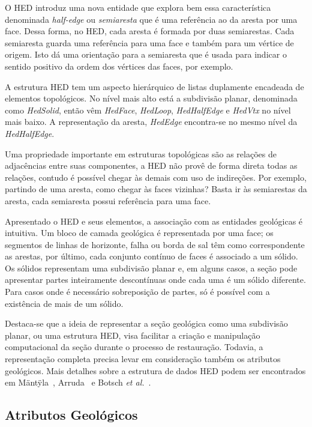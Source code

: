 O HED introduz uma nova entidade que explora bem essa característica denominada \textit{half-edge} ou \textit{semiaresta} que é uma referência ao  da aresta por uma face. Dessa forma, no HED, cada aresta é formada por duas semiarestas. Cada semiaresta guarda uma referência para uma face e também para um vértice de origem. Isto dá uma orientação para a semiaresta que é usada para indicar o sentido positivo da ordem dos vértices das faces, por exemplo.

A estrutura HED tem um aspecto hierárquico de listas duplamente encadeada de elementos topológicos. No nível mais alto está a subdivisão planar, denominada como \textit{HedSolid}, então vêm \textit{HedFace}, \textit{HedLoop}, \textit{HedHalfEdge} e \textit{HedVtx} no nível mais baixo. A representação da aresta, \textit{HedEdge} encontra-se no mesmo nível da \emph{HedHalfEdge}.

Uma propriedade importante em estruturas topológicas são as relações de adjacências entre suas componentes, a HED não provê de forma direta todas as relações, contudo é possível chegar às demais com uso de indireções. Por exemplo, partindo de uma aresta, como chegar às faces vizinhas? Basta ir às semiarestas da aresta, cada semiaresta possui referência para uma face.

Apresentado o HED e seus elementos, a associação com as entidades geológicas é intuitiva. Um bloco de camada geológica é representada por uma face; os segmentos de linhas de horizonte, falha ou borda de sal têm como correspondente as arestas, por último, cada conjunto contínuo de faces é associado a um sólido. Os sólidos representam uma subdivisão planar e, em alguns casos, a seção pode apresentar partes inteiramente descontínuas onde cada uma é um sólido diferente. Para casos onde é necessário sobreposição de partes, só é possível com a existência de mais de um sólido.

Destaca-se que a ideia de representar a seção geológica como uma subdivisão planar, ou uma estrutura HED, visa facilitar a criação e manipulação computacional da seção durante o processo de restauração. Todavia, a representação completa precisa levar em consideração também os atributos geológicos. Mais detalhes sobre a estrutura de dados HED podem ser encontrados em Mäntÿla~\cite{HED}, Arruda~\cite{Arruda} e Botsch \textit{et al.}~\cite{Botsch}.

\subsection{Atributos Geológicos}\label{geological-attributes}

